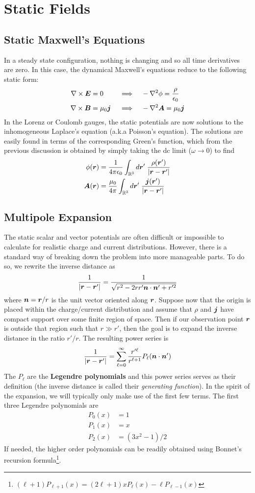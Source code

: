 \documentclass[twocolumn]{gwclass}
\newcommand{\R}{\mathbb{R}}
\begin{document}
	
	\section{Static Fields}
	\subsection{Static Maxwell's Equations}
	In a steady state configuration, nothing is changing and so all time derivatives are zero. In this case, the dynamical Maxwell's equations reduce to the following static form:
	\begin{align*}
		\nabla\times\boldsymbol{E} &= 0  &&\implies&& -\nabla^2\phi = \frac{\rho}{\epsilon_0}\\
		\nabla\times\boldsymbol{B} &= \mu_0\boldsymbol{j} &&\implies&&  -\nabla^2\boldsymbol{A} = \mu_0\boldsymbol{j}
	\end{align*}
	In the Lorenz or Coulomb gauges, the static potentials are now solutions to the inhomogeneous Laplace's equation (a.k.a Poisson's equation). The solutions are easily found in terms of the corresponding Green's function, which from the previous discussion is obtained by simply taking the dc limit ($\omega\to0$) to find
	\begin{align*}
	\phi(\*r) &= \frac{1}{4\pi\epsilon_0}\int_{\R^3}d\*r'\;\frac{\rho(\*r')}{|\*r-\*r'|} \\
	\*A(\*r) &= \frac{\mu_0}{4\pi}\int_{\R^3}d\*r'\;\frac{\*j(\*r')}{|\*r-\*r'|}
	\end{align*}
	
	\subsection{Multipole Expansion}
	The static scalar and vector potentials are often difficult or impossible to calculate for realistic charge and current distributions. However, there is a standard way of breaking down the problem into more manageable parts. To do so, we rewrite the inverse distance as
	$$ \frac{1}{|\boldsymbol{r}-\boldsymbol{r}'|} = \frac{1}{\sqrt{r^2 - 2rr'\boldsymbol{n}\cdot\boldsymbol{n}' + r'^2}}$$
	where $\boldsymbol{n}=\boldsymbol{r}/r$ is the unit vector oriented along $\boldsymbol{r}$. Suppose now that the origin is placed within the charge/current distribution and assume that $\rho$ and $\boldsymbol{j}$ have compact support over some finite region of space. Then if our observation point $\boldsymbol{r}$ is outside that region such that $r\gg r'$, then the goal is to expand the inverse distance in the ratio $r'/r$. The resulting power series is 
	$$ \frac{1}{|\boldsymbol{r}-\boldsymbol{r}'|} =\sum_{\ell=0}^\infty \frac{r'^\ell}{r^{\ell+1}} P_\ell(\boldsymbol{n}\cdot\boldsymbol{n}')$$
	The $P_\ell$ are the \textbf{Legendre polynomials} and this power series serves as their definition (the inverse distance is called their \emph{generating function}). In the spirit of the expansion, we will typically only make use of the first few terms. The first three Legendre polynomials are
	\begin{align*}
		P_0(x) &= 1\\
		P_1(x) &= x\\
		P_2(x) &= (3x^2 - 1)/2
	\end{align*}
	If needed, the higher order polynomials can be readily obtained using Bonnet's recursion formula\footnote{$(\ell+1)P_{\ell+1}(x)=(2\ell+1)xP_\ell(x) - \ell P_{\ell-1}(x)$}. 
	
\end{document}

